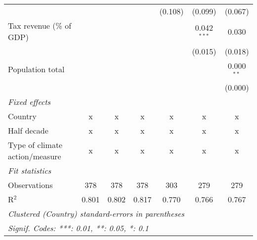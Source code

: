 \begin{tabular}{lcccccc}
                                                        &         &         &                & (0.108)        & (0.099)        & (0.067)\\   
   Tax revenue (\% of GDP)                              &         &         &                &                & 0.042$^{***}$  & 0.030\\   
                                                        &         &         &                &                & (0.015)        & (0.018)\\   
   Population total                                     &         &         &                &                &                & 0.000$^{**}$\\   
                                                        &         &         &                &                &                & (0.000)\\   
   \emph{Fixed effects}\\
   Country                                              & x       & x       & x              & x              & x              & x\\  
   Half decade                                          & x       & x       & x              & x              & x              & x\\  
   Type of climate action/measure                       & x       & x       & x              & x              & x              & x\\  
   \midrule \emph{Fit statistics}\\
   Observations                                         & 378     & 378     & 378            & 303            & 279            & 279\\  
   R$^2$                                                & 0.801   & 0.802   & 0.817          & 0.770          & 0.766          & 0.767\\  
   \midrule
   \multicolumn{7}{l}{\emph{Clustered (Country) standard-errors in parentheses}}\\
   \multicolumn{7}{l}{\emph{Signif. Codes: ***: 0.01, **: 0.05, *: 0.1}}\\
\end{tabular}
\par\endgroup


